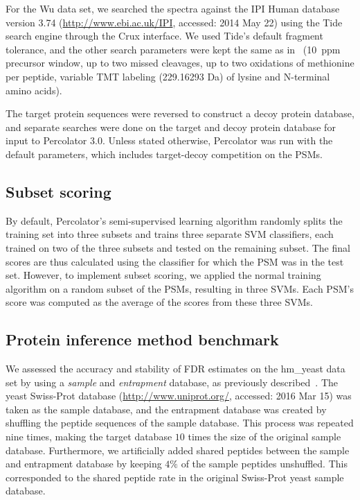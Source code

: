 \documentclass{article}
\begin{document}
For the Wu data set, we searched the spectra against the IPI Human
database version 3.74 (\url{http://www.ebi.ac.uk/IPI}, accessed: 2014
May 22) using the Tide search engine through the Crux interface. We
used Tide's default fragment tolerance, and the other search
parameters were kept the same as in~\cite{wu2013} (10~ppm precursor
window, up to two missed cleavages, up to two oxidations of methionine
per peptide, variable TMT labeling (229.16293 Da) of lysine and
N-terminal amino acids).

The target protein sequences were reversed to construct a decoy 
protein database, and separate searches were done on the target and 
decoy protein database for input to Percolator 3.0. Unless stated 
otherwise, Percolator was run with the default parameters, which 
includes target-decoy competition on the PSMs.

\subsection*{Subset scoring}

By default, Percolator's semi-supervised learning algorithm randomly 
splits the training set into three subsets and trains three separate 
SVM classifiers, each trained on two of the three subsets and tested 
on the remaining subset.  The final scores are thus calculated using 
the classifier for which the PSM was in the test set. However, to 
implement subset scoring, we applied the normal training algorithm on 
a random subset of the PSMs, resulting in three SVMs.  Each PSM's 
score was computed as the average of the scores from these three SVMs.

\subsection*{Protein inference method benchmark}

We assessed the accuracy and stability of FDR estimates on the
hm\_yeast data set by using a {\em sample} and {\em entrapment}
database, as previously described~\cite{granholm2013determining}. The
yeast Swiss-Prot database (\url{http://www.uniprot.org/}, accessed:
2016 Mar 15) was taken as the sample database, and the entrapment
database was created by shuffling the peptide sequences of the sample
database. This process was repeated nine times, making the target
database $10$ times the size of the original sample database.
Furthermore, we artificially added shared peptides between the sample
and entrapment database by keeping $4\%$ of the sample peptides
unshuffled. This corresponded to the shared peptide rate in the
original Swiss-Prot yeast sample database.
\end{document}
